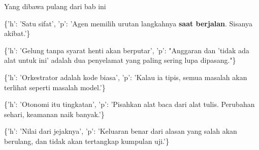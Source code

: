 \documentclass[aspectratio=169,11pt,t]{beamer}
\begin{document}
\begin{frame}[shrink=25]{Yang dibawa pulang dari bab ini}
\begin{isteps}
\item \{'h': 'Satu sifat', 'p': 'Agen memilih urutan langkahnya \textbf{saat berjalan}. Sisanya akibat.'\}
\item \{'h': 'Gelung tanpa syarat henti akan berputar', 'p': "Anggaran dan 'tidak ada alat untuk ini' adalah dua penyelamat yang paling sering lupa dipasang."\}
\item \{'h': 'Orkestrator adalah kode biasa', 'p': 'Kalau ia tipis, semua masalah akan terlihat seperti masalah model.'\}
\item \{'h': 'Otonomi itu tingkatan', 'p': 'Pisahkan alat baca dari alat tulis. Perubahan sehari, keamanan naik banyak.'\}
\item \{'h': 'Nilai dari jejaknya', 'p': 'Keluaran benar dari alasan yang salah akan berulang, dan tidak akan tertangkap kumpulan uji.'\}
\end{isteps}
\end{frame}
\end{document}
